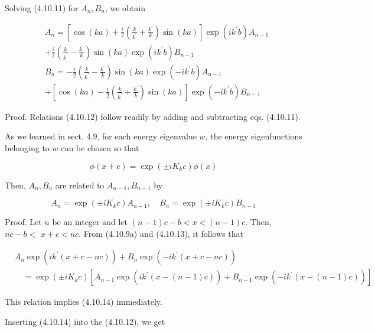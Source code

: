 \documentclass{article}
\begin{document}
Solving (4.10.11) for $A_{n}, B_{n}$, we obtain
 
\begin{align*}
& A_{n}=\left[\cos (k a)+\frac{i}{2}\left(\frac{k}{k^{\prime}}+\frac{k^{\prime}}{k}\right) \sin (k a)\right] \exp \left(i k^{\prime} b\right) A_{n-1}  \tag{4.10.12a}\\
& +\frac{i}{2}\left(\frac{k}{k^{\prime}}-\frac{k^{\prime}}{k}\right) \sin (k a) \exp \left(i k^{\prime} b\right) B_{n-1} \\
& B_{n}=-\frac{i}{2}\left(\frac{k}{k^{\prime}}-\frac{k^{\prime}}{k}\right) \sin (k a) \exp \left(-i k^{\prime} b\right) A_{n-1}  \tag{4.10.12b}\\
& +\left[\cos (k a)-\frac{i}{2}\left(\frac{k}{k^{\prime}}+\frac{k^{\prime}}{k}\right) \sin (k a)\right] \exp \left(-i k^{\prime} b\right) B_{n-1}
\end{align*}
 

Proof. Relations (4.10.12) follow readily by adding and subtracting eqs. (4.10.11).

As we learned in sect. 4.9, for each energy eigenvalue $w$, the energy eigenfunctions belonging to $w$ can be chosen so that
 
\begin{equation*}
\phi(x+c)=\exp \left( \pm i K_{k} c\right) \phi(x) \tag{4.10.13}
\end{equation*}
 

Then, $A_{n}, B_{n}$ are related to $A_{n-1}, B_{n-1}$ by
 
\begin{equation*}
A_{n}=\exp \left( \pm i K_{k} c\right) A_{n-1}, \quad B_{n}=\exp \left( \pm i K_{k} c\right) B_{n-1} \tag{4.10.14}
\end{equation*}
 

Proof. Let $n$ be an integer and let $(n-1) c-b<x<(n-1) c$. Then, $n c-b<$ $x+c<n c$. From (4.10.9a) and (4.10.13), it follows that
 
\begin{align*}
& A_{n} \exp \left(i k^{\prime}(x+c-n c)\right)+B_{n} \exp \left(-i k^{\prime}(x+c-n c)\right)  \tag{4.10.15}\\
& \quad=\exp \left( \pm i K_{k} c\right)\left[A_{n-1} \exp \left(i k^{\prime}(x-(n-1) c)\right)+B_{n-1} \exp \left(-i k^{\prime}(x-(n-1) c)\right)\right]
\end{align*}
 

This relation implies (4.10.14) immediately.

Inserting (4.10.14) into the (4.10.12), we get
 
\end{document}
